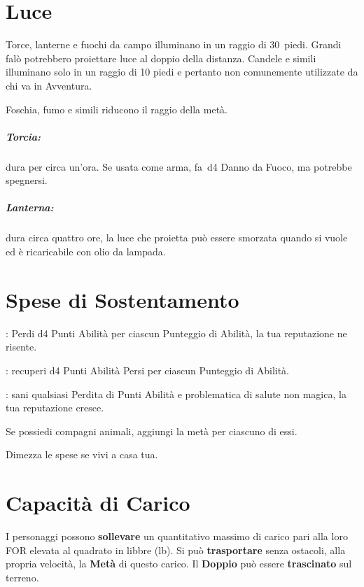 \documentclass[itdr]{subfiles}
\begin{document}
\vfill

\section{Luce}

Torce, lanterne e fuochi da campo illuminano in un raggio di \mbox{30 piedi}. Grandi falò potrebbero proiettare luce al doppio della distanza. Candele e simili illuminano solo in un raggio di 10 piedi e pertanto non comunemente utilizzate da chi va in Avventura.

Foschia, fumo e simili riducono il raggio della metà.

\subparagraph{Torcia:} dura per circa un'ora. Se usata come arma, fa~d4 Danno da Fuoco, ma potrebbe spegnersi.

\subparagraph{Lanterna:} dura circa quattro ore, la luce che proietta può essere smorzata quando si vuole ed è ricaricabile con olio da lampada.

\vfill

\section{Spese di Sostentamento}

:
Perdi d4 Punti Abilità per ciascun Punteggio di Abilità, la tua reputazione ne risente.

:
recuperi d4 Punti Abilità Persi per ciascun Punteggio di Abilità.

:
sani qualsiasi Perdita di Punti Abilità e problematica di salute non magica, la tua reputazione cresce.

Se possiedi compagni animali, aggiungi la metà per ciascuno di essi.

Dimezza le spese se vivi a casa tua.

\vfill

\section{Capacità di Carico}

I personaggi possono \textbf{sollevare} un quantitativo massimo di carico pari alla loro FOR elevata al quadrato in libbre (lb). Si può \textbf{trasportare} senza ostacoli, alla propria velocità, la \textbf{Metà} di questo carico. Il \textbf{Doppio} può essere \textbf{trascinato} sul terreno.
\end{document}
